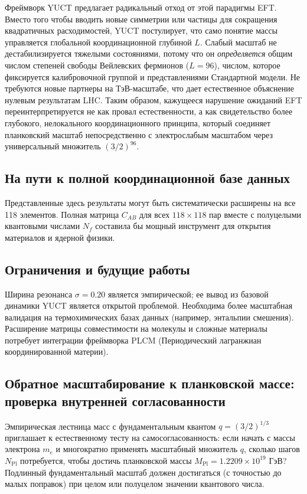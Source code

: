 \documentclass[11pt,a4paper]{article}
\newcommand{\Mpl}{M_{\mathrm{Pl}}}
\begin{document}
	Фреймворк YUCT предлагает радикальный отход от этой парадигмы EFT. Вместо того чтобы вводить новые симметрии или частицы для сокращения квадратичных расходимостей, YUCT постулирует, что само понятие массы управляется глобальной координационной глубиной \(L\). Слабый масштаб не дестабилизируется тяжелыми состояниями, потому что он \emph{определяется} общим числом степеней свободы Вейлевских фермионов (\(L=96\)), числом, которое фиксируется калибровочной группой и представлениями Стандартной модели. Не требуются новые партнеры на ТэВ-масштабе, что дает естественное объяснение нулевым результатам LHC. Таким образом, кажущееся нарушение ожиданий EFT переинтерпретируется не как провал естественности, а как свидетельство более глубокого, нелокального координационного принципа, который соединяет планковский масштаб непосредственно с электрослабым масштабом через универсальный множитель \((3/2)^{96}\).
	
	\subsection{На пути к полной координационной базе данных}
	
	Представленные здесь результаты могут быть систематически расширены на все 118 элементов. Полная матрица \(C_{AB}\) для всех \(118\times 118\) пар вместе с полуцелыми квантовыми числами \(N_f\) составила бы мощный инструмент для открытия материалов и ядерной физики.
	
	\subsection{Ограничения и будущие работы}
	
	Ширина резонанса \(\sigma = 0.20\) является эмпирической; ее вывод из базовой динамики YUCT является открытой проблемой. Необходима более масштабная валидация на термохимических базах данных (например, энтальпии смешения). Расширение матрицы совместимости на молекулы и сложные материалы потребует интеграции фреймворка PLCM (Периодический лагранжиан координированной материи).
	
	\subsection{Обратное масштабирование к планковской массе: проверка внутренней согласованности}
	\label{subsec:reverse}
	
	Эмпирическая лестница масс с фундаментальным квантом $q = (3/2)^{1/3}$ приглашает к естественному тесту на самосогласованность: если начать с массы электрона $m_e$ и многократно применять масштабный множитель $q$, сколько шагов $N_{\mathrm{Pl}}$ потребуется, чтобы достичь планковской массы $\Mpl = 1.2209\times10^{19}$ ГэВ? Подлинный фундаментальный масштаб должен достигаться (с точностью до малых поправок) при целом или полуцелом значении квантового числа.
	
\end{document}
